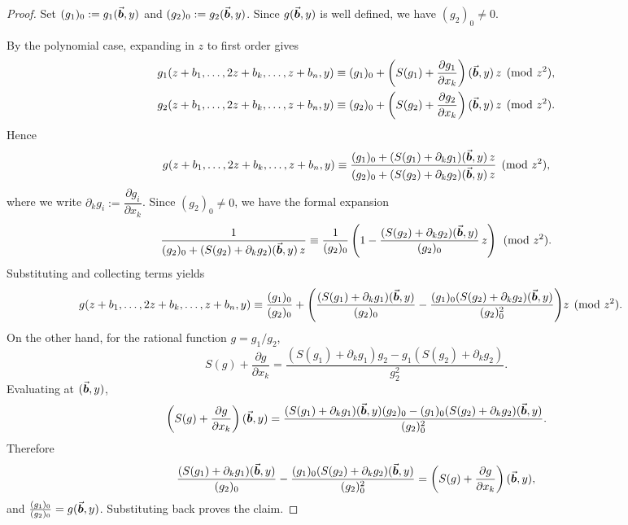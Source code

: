 \documentclass{article}
\numberwithin{equation}{section}
\begin{document}
\begin{proof}
Set $(g_1)_0:=g_1(\vec{\boldsymbol{b}},y)$ and $(g_2)_0:=g_2(\vec{\boldsymbol{b}},y)$. Since $g(\vec{\boldsymbol{b}},y)$ is well defined, we have $(g_2)_0\neq 0$.

By the polynomial case, expanding in $z$ to first order gives
\[
\begin{aligned}
g_1(z+b_1,\dots,2z+b_k,\dots,z+b_n,y)
&\equiv
(g_1)_0+\left(S(g_1)+\frac{\partial g_1}{\partial x_k}\right)(\vec{\boldsymbol{b}},y)\,z
\pmod{z^2},\\
g_2(z+b_1,\dots,2z+b_k,\dots,z+b_n,y)
&\equiv
(g_2)_0+\left(S(g_2)+\frac{\partial g_2}{\partial x_k}\right)(\vec{\boldsymbol{b}},y)\,z
\pmod{z^2}.
\end{aligned}
\]
Hence
%
\[
g(z+b_1,\dots,2z+b_k,\dots,z+b_n,y)
\equiv
\frac{(g_1)_0+(S(g_1)+\partial_k g_1)(\vec{\boldsymbol{b}},y)\,z}
{(g_2)_0+(S(g_2)+\partial_k g_2)(\vec{\boldsymbol{b}},y)\,z}
\pmod{z^2},
\]
where we write $\partial_k g_i := \dfrac{\partial g_i}{\partial x_k}$.
%
Since $(g_2)_0\neq 0$, we have the formal expansion
\[
\frac{1}{(g_2)_0+(S(g_2)+\partial_k g_2)(\vec{\boldsymbol{b}},y)\,z}
\equiv
\frac{1}{(g_2)_0}
\left(1-\frac{(S(g_2)+\partial_k g_2)(\vec{\boldsymbol{b}},y)}{(g_2)_0}\,z\right)
\pmod{z^2}.
\]
Substituting and collecting terms yields
\[
\begin{aligned}
g(z+b_1,\dots,2z+b_k,\dots,z+b_n,y)
&\equiv
\frac{(g_1)_0}{(g_2)_0}
+
\Bigg(
\frac{(S(g_1)+\partial_k g_1)(\vec{\boldsymbol{b}},y)}{(g_2)_0}
-
\frac{(g_1)_0(S(g_2)+\partial_k g_2)(\vec{\boldsymbol{b}},y)}{(g_2)_0^2}
\Bigg) z
\pmod{z^2}.
\end{aligned}
\]
On the other hand, for the rational function $g=g_1/g_2$,
\[
S(g)+\frac{\partial g}{\partial x_k}
=
\frac{(S(g_1)+\partial_k g_1)g_2 - g_1(S(g_2)+\partial_k g_2)}{g_2^2}.
\]
Evaluating at $(\vec{\boldsymbol{b}},y)$,
\[
\left(S(g)+\frac{\partial g}{\partial x_k}\right)(\vec{\boldsymbol{b}},y)
=
\frac{(S(g_1)+\partial_k g_1)(\vec{\boldsymbol{b}},y)(g_2)_0
-
(g_1)_0(S(g_2)+\partial_k g_2)(\vec{\boldsymbol{b}},y)}
{(g_2)_0^2}.
\]
Therefore
\[
\frac{(S(g_1)+\partial_k g_1)(\vec{\boldsymbol{b}},y)}{(g_2)_0}
-
\frac{(g_1)_0(S(g_2)+\partial_k g_2)(\vec{\boldsymbol{b}},y)}{(g_2)_0^2}
=
\left(S(g)+\frac{\partial g}{\partial x_k}\right)(\vec{\boldsymbol{b}},y),
\]
and $\frac{(g_1)_0}{(g_2)_0}=g(\vec{\boldsymbol{b}},y)$. Substituting back proves the claim.
\end{proof}






\end{document}
